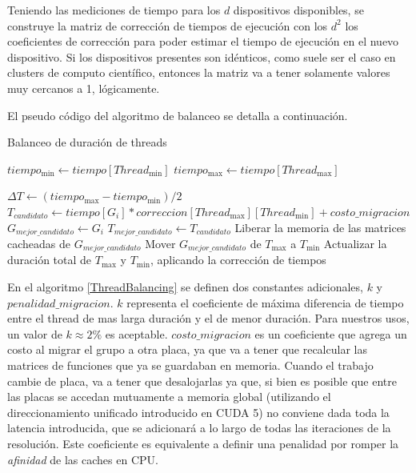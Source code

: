 Teniendo las mediciones de tiempo para los $d$ dispositivos disponibles, se construye la matriz de
correcci\'on de tiempos de ejecuci\'on con los $d^2$ los coeficientes de correcci\'on para poder estimar el tiempo de
ejecuci\'on en el nuevo dispositivo. Si los dispositivos presentes son id\'enticos, como suele ser el caso
en clusters de computo cient\'ifico, entonces
la matriz va a tener solamente valores muy cercanos a 1, l\'ogicamente.

El pseudo c\'odigo del algoritmo de balanceo se detalla a continuaci\'on.
\begin{algorithm}
  \caption{Balanceo de duraci\'on de threads}
  \label{ThreadBalancing}
\begin{algorithmic}
  \State $tiempo_{\min} \gets tiempo[Thread_{\min}]$
  \State $tiempo_{\max} \gets tiempo[Thread_{\max}]$

    \State $\Delta T \gets (tiempo_{\max} - tiempo_{\min}) /2$
    \State $T_{candidato} \gets  tiempo[G_i] * correccion[Thread_{\max}][Thread_{\min}] + costo\_migracion$
        \State $G_{mejor\_candidato} \gets G_i$
        \State $T_{mejor\_candidato} \gets T_{candidato}$
      \EndIf
    \EndFor
   \State Liberar la memoria de las matrices cacheadas de $G_{mejor\_candidato}$
   \State Mover $G_{mejor\_candidato}$ de $T_{\max}$ a $T_{\min}$
   \State Actualizar la duraci\'on total de $T_{\max}$ y $T_{\min}$, aplicando la correcci\'on de tiempos
  \EndWhile
\end{algorithmic}
\end{algorithm}

En el algoritmo \ref{ThreadBalancing} se definen dos constantes adicionales, $k$ y $penalidad\_migracion$.
$k$ representa el coeficiente de m\'axima diferencia de tiempo entre el thread de mas larga duraci\'on y el de menor
duraci\'on. Para nuestros usos, un valor de $k \approx 2\%$ es aceptable.
$costo\_migracion$ es un coeficiente que agrega un costo al migrar el grupo a otra placa, ya que va
a tener que recalcular las matrices de funciones que ya se guardaban en memoria. Cuando el trabajo cambie de placa, va a tener
que desalojarlas ya que, si bien es posible que entre las placas se accedan mutuamente a memoria global (utilizando
el direccionamiento unificado introducido en CUDA 5\cite{cudaProgrammingGuide})
no conviene dada toda la latencia introducida, que se adicionar\'a a lo largo de todas las iteraciones de la resoluci\'on.
Este coeficiente es equivalente a definir una penalidad por romper la \textit{afinidad} de las caches en CPU.

